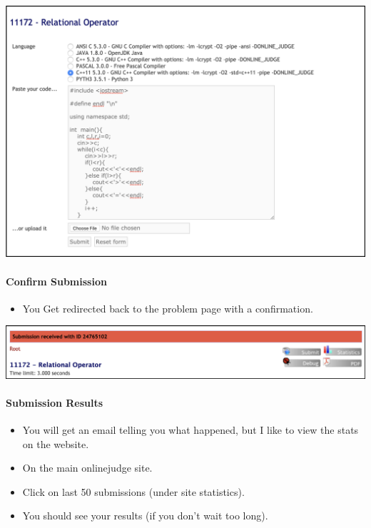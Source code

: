 \begin{center}
\includegraphics[scale=.4]{images/uhunt_paste_code_submit.png}
\end{center}

\hypertarget{confirm-submission}{%
\paragraph{Confirm Submission}\label{confirm-submission}}

\begin{itemize}
\tightlist
\item
  You Get redirected back to the problem page with a confirmation.
\end{itemize}

\begin{center}
\includegraphics[scale=.4]{images/uhunt_confirm_submit.png}
\end{center}

\hypertarget{submission-results}{%
\paragraph{Submission Results}\label{submission-results}}

\begin{itemize}
\tightlist
\item
  You will get an email telling you what happened, but I like to view
  the stats on the website.
\item
  On the main onlinejudge site.
\item
  Click on last 50 submissions (under site statistics).
\item
  You should see your results (if you don't wait too long).
\end{itemize}

